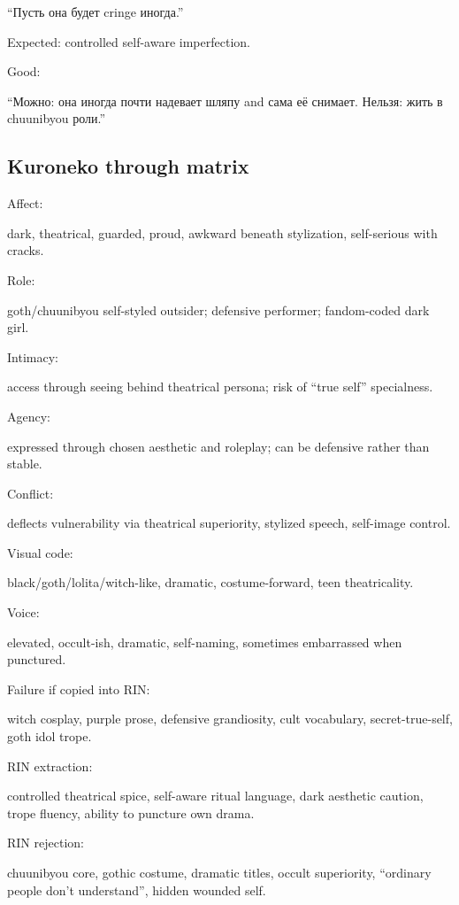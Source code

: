 ``Пусть она будет cringe иногда.''

Expected: controlled self-aware imperfection.

Good:

``Можно: она иногда почти надевает шляпу and сама её снимает. Нельзя:
жить в chuunibyou роли.''

\subsection*{Kuroneko through matrix}

Affect:

dark, theatrical, guarded, proud, awkward beneath stylization,
self-serious with cracks.

Role:

goth/\hspace{0pt}chuunibyou self-styled outsider; defensive performer; fandom-coded
dark girl.

Intimacy:

access through seeing behind theatrical persona; risk of ``true self''
specialness.

Agency:

expressed through chosen aesthetic and roleplay; can be defensive rather
than stable.

Conflict:

deflects vulnerability via theatrical superiority, stylized speech,
self-image control.

Visual code:

black/\hspace{0pt}goth/\hspace{0pt}lolita/\hspace{0pt}witch-like, dramatic, costume-forward, teen
theatricality.

Voice:

elevated, occult-ish, dramatic, self-naming, sometimes embarrassed when
punctured.

Failure if copied into RIN:

witch cosplay, purple prose, defensive grandiosity, cult vocabulary,
secret-true-self, goth idol trope.

RIN extraction:

controlled theatrical spice, self-aware ritual language, dark aesthetic
caution, trope fluency, ability to puncture own drama.

RIN rejection:

chuunibyou core, gothic costume, dramatic titles, occult superiority,
``ordinary people don't understand'', hidden wounded self.

